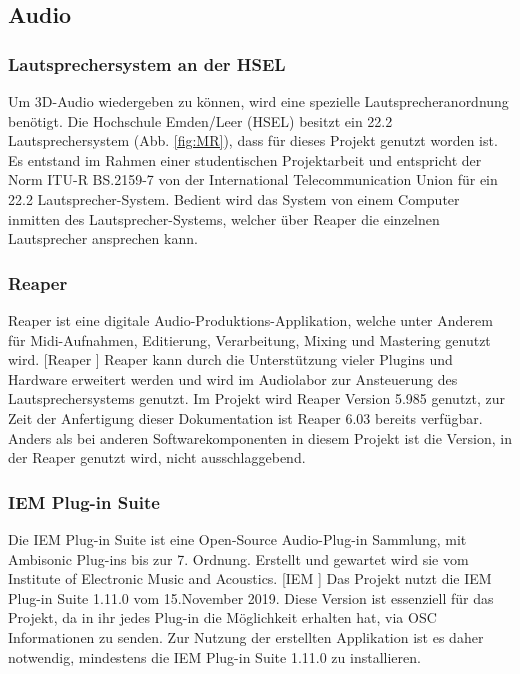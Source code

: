 \documentclass[11pt, titlepage, fleqn]{report}
\begin{document}
            \subsection{Audio}
            \label{sec:2.3.1 Audio}
                \subsubsection{Lautsprechersystem an der HSEL}
                    Um 3D-Audio wiedergeben zu können, wird eine spezielle Lautsprecheranordnung benötigt. Die Hochschule Emden/Leer (HSEL) besitzt ein 
                    22.2 Lautsprechersystem (Abb. \ref{fig:MR}), dass für 
                    dieses Projekt 
                    genutzt worden ist. Es entstand im Rahmen einer 
                    studentischen Projektarbeit und entspricht 
                    der Norm ITU-R BS.2159-7 von der International Telecommunication Union für ein 22.2 Lautsprecher-System.
                    Bedient wird das System von einem Computer inmitten des Lautsprecher-Systems, welcher über Reaper die einzelnen Lautsprecher ansprechen kann.
                    
                \subsubsection{Reaper}
                \label{sec:Reaper}
                    Reaper ist eine digitale Audio-Produktions-Applikation, 
                    welche unter Anderem für Midi-Aufnahmen, Editierung, 
                    Verarbeitung, Mixing und Mastering 
                    genutzt wird. [Reaper \cite{Reaper}]\newline 
                    Reaper kann durch die Unterstützung vieler Plugins und Hardware erweitert werden und wird im Audiolabor zur Ansteuerung des Lautsprechersystems genutzt.
                    Im Projekt wird Reaper Version 5.985 genutzt, zur Zeit der 
                    Anfertigung dieser Dokumentation ist Reaper 6.03 bereits 
                    verfügbar. Anders als bei anderen 
                    Softwarekomponenten in diesem Projekt ist die Version, in der Reaper genutzt wird, nicht ausschlaggebend.                
                \subsubsection{IEM Plug-in Suite}
                \label{sec:Suite}
                    Die IEM Plug-in Suite ist eine Open-Source Audio-Plug-in 
                    Sammlung, mit Ambisonic Plug-ins bis zur 7. Ordnung. 
                    Erstellt und gewartet wird sie vom Institute of 
                    Electronic Music and Acoustics. [IEM \cite{IEM}]\newline
                    Das Projekt nutzt die IEM Plug-in Suite 1.11.0 vom 
                    15.November 2019. Diese Version ist essenziell für das 
                    Projekt, da in ihr jedes 
                    Plug-in die Möglichkeit erhalten hat, via OSC Informationen 
                    zu senden. Zur Nutzung der erstellten Applikation ist es 
                    daher notwendig, mindestens 
                    die IEM Plug-in Suite 1.11.0 zu installieren.                
\end{document}
